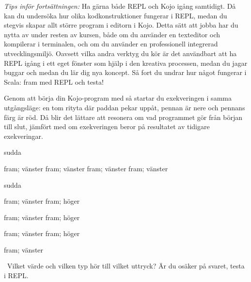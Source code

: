\begin{framed}
\noindent\emph{Tips inför fortsättningen:} Ha gärna både REPL och Kojo igång samtidigt. Då kan du undersöka hur olika kodkonstruktioner fungerar i REPL, medan du stegvis skapar allt större program i editorn i Kojo. Detta sätt att jobba har du nytta av under resten av kursen, både om du använder en texteditor och kompilerar i terminalen, och om du använder en professionell integrerad utvecklingsmiljö. Oavsett vilka andra verktyg du kör är det användbart att ha REPL igång i ett eget fönster som hjälp i den kreativa processen, medan du jagar buggar och medan du lär dig nya koncept. Så fort du undrar hur något fungerar i Scala: fram med REPL och testa!
\end{framed}


\SOLUTION

\TaskSolved \what

\SubtaskSolved Genom att börja din Kojo-program med  så startar du exekveringen i samma utgångsläge: en tom rityta  där paddan pekar uppåt, pennan är nere och pennans färg är röd.  Då blir det lättare att resonera om vad programmet gör från början till slut, jämfört med om exekveringen beror på resultatet av tidigare exekveringar.


\SubtaskSolved
\begin{Code}
sudda

fram; vänster
fram; vänster
fram; vänster
fram; vänster
\end{Code}


\SubtaskSolved
\begin{Code}
sudda

fram; vänster
fram; höger

fram; vänster
fram; höger

fram; vänster
fram; höger

fram; vänster
\end{Code}


\QUESTEND









\clearpage

\ExtraTasks %




\QUESTBEGIN

\Task \what~Vilket värde och vilken typ hör till vilket uttryck?  Är du osäker på svaret, testa i REPL.

